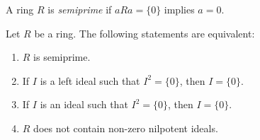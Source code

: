 




\begin{definition}
	A ring $R$ is \emph{semiprime} if 
	$aRa=\{0\}$ implies $a=0$.
\end{definition}

\begin{proposition}
	Let $R$ be a ring. The following statements are equivalent: 
	\begin{enumerate}
		\item $R$ is semiprime.
		\item If $I$ is a left ideal such that $I^2=\{0\}$, then $I=\{0\}$.
		\item If $I$ is an ideal such that $I^2=\{0\}$, then $I=\{0\}$.
		\item $R$ does not contain non-zero nilpotent ideals.
	\end{enumerate}
\end{proposition}

